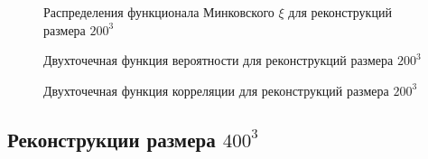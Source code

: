 			\begin{figure}[h]
				\begin{minipage}[h]{0.49\linewidth}
				\end{minipage}
				\hfill
				\begin{minipage}[h]{0.49\linewidth}
				\end{minipage}
				\caption{Распределения функционала Минковского $\xi$ для реконструкций размера $200^3$}
				\label{5-dist-Xi-200}
			\end{figure}
		
			\begin{figure}[h]
				\begin{minipage}[h]{0.49\linewidth}
				\end{minipage}
				\hfill
				\begin{minipage}[h]{0.49\linewidth}
				\end{minipage}
				\caption{Двухточечная функция вероятности для реконструкций размера $200^3$}
				\label{5-prob-200}
			\end{figure}
			
			\begin{figure}[h]
				\begin{minipage}[h]{0.49\linewidth}
				\end{minipage}
				\hfill
				\begin{minipage}[h]{0.49\linewidth}
				\end{minipage}
				\caption{Двухточечная функция корреляции для реконструкций размера $200^3$}
				\label{5-corr-200}
			\end{figure}

	\subsection{Реконструкции размера $400^3$}
